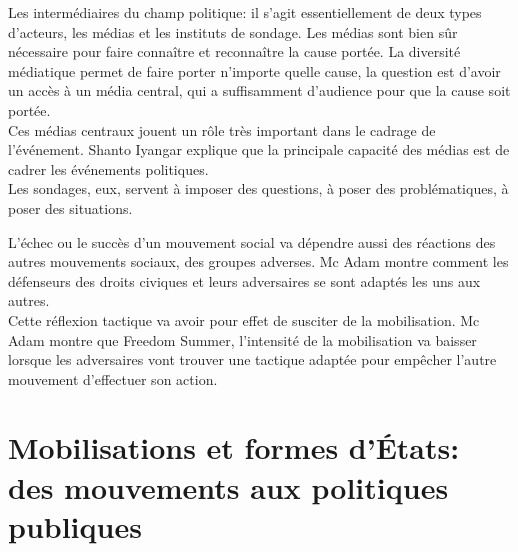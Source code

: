 \documentclass[10pt, a4paper, openany]{book}
\begin{document}
Les intermédiaires du champ politique: il s'agit essentiellement de deux types d'acteurs, les médias et les instituts de sondage. Les médias sont bien sûr nécessaire pour faire connaître et reconnaître la cause portée. La diversité médiatique permet de faire porter n'importe quelle cause, la question est d'avoir un accès à un média central, qui a suffisamment d'audience pour que la cause soit portée. \\
Ces médias centraux jouent un rôle très important dans le cadrage de l'événement. Shanto Iyangar explique que la principale capacité des médias est de cadrer les événements politiques. \\
Les sondages, eux, servent à imposer des questions, à poser des problématiques, à poser des situations. 


L'échec ou le succès d'un mouvement social va dépendre aussi des réactions des autres mouvements sociaux, des groupes adverses. Mc Adam montre comment les défenseurs des droits civiques et leurs adversaires se sont adaptés les uns aux autres. \\
Cette réflexion tactique va avoir pour effet de susciter de la mobilisation. Mc Adam montre que Freedom Summer, l'intensité de la mobilisation va baisser lorsque les adversaires vont trouver une tactique adaptée pour empêcher l'autre mouvement d'effectuer son action. 

\section{Mobilisations et formes d'États: des mouvements aux politiques publiques}
\end{document}
